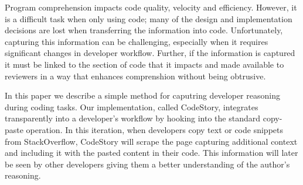 \documentclass[../manifest.tex]{subfiles}
\begin{document}
Program comprehension impacts code quality, velocity and efficiency. However, it
is a difficult task when only using code; many of the design and implementation
decisions are lost when transferring the information into code. Unfortunately,
capturing this information can be challenging, especially when it requires
significant changes in developer workflow. Further, if the information is captured
it must be linked to the section of code that it impacts and made available to
reviewers in a way that enhances comprenshion without being obtrusive.

In this paper we describe a simple method for caputring developer reasoning
during coding tasks. Our implementation, called CodeStory, integrates transparently
into a developer's workflow by hooking into the standard copy-paste operation. In
this iteration, when developers copy text or code snippets from StackOverflow,
CodeStory will scrape the page capturing additional context and including it with
the pasted content in their code. This information will later be seen by other
developers giving them a better understanding of the author's reasoning.
\end{document}
